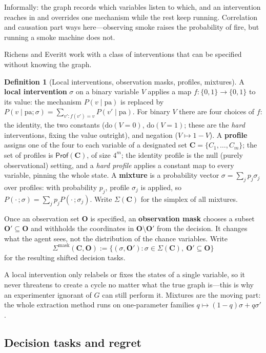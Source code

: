 \documentclass[11pt]{amsart}
\theoremstyle{plain}
\theoremstyle{definition}
\newtheorem{definition}[theorem]{Definition}
\newcommand{\bC}{\mathbf{C}}
\newcommand{\bO}{\mathbf{O}}
\newcommand{\Prof}{\mathsf{Prof}}
\begin{document}
Informally: the graph records which variables listen to which, and an intervention reaches in and overrides one mechanism while the rest keep running. Correlation and causation part ways here---observing smoke raises the probability of fire, but running a smoke machine does not.

Richens and Everitt work with a class of interventions that can be specified without knowing the graph.

\begin{definition}[Local interventions, observation masks, profiles, mixtures]\label{def:local}
A \textbf{local intervention} $\sigma$ on a binary variable $V$ applies a map $f\colon\{0,1\}\to\{0,1\}$ to its value: the mechanism $P(v\mid \mathrm{pa})$ is replaced by $P(v \mid \mathrm{pa};\sigma)=\sum_{v'\colon f(v')=v}P(v'\mid \mathrm{pa})$. For binary $V$ there are four choices of $f$: the identity, the two constants ($\mathrm{do}(V\!=\!0)$, $\mathrm{do}(V\!=\!1)$; these are the \emph{hard} interventions, fixing the value outright), and negation ($V\mapsto 1-V$). A \textbf{profile} assigns one of the four to each variable of a designated set $\bC=\{C_1,\dots,C_m\}$; the set of profiles is $\Prof(\bC)$, of size $4^{m}$; the identity profile is the null (purely observational) setting, and a \emph{hard profile} applies a constant map to every variable, pinning the whole state. A \textbf{mixture} is a probability vector $\sigma=\sum_j p_j\sigma_j$ over profiles: with probability $p_j$, profile $\sigma_j$ is applied, so $P(\cdot\,;\sigma)=\sum_j p_j P(\cdot\,;\sigma_j)$. Write $\Sigma(\bC)$ for the simplex of all mixtures.

Once an observation set $\bO$ is specified, an \textbf{observation mask} chooses a subset $\bO'\subseteq\bO$ and withholds the coordinates in $\bO\setminus\bO'$ from the decision. It changes what the agent sees, not the distribution of the chance variables. Write
\[
   \Sigma^\mathrm{mask}(\bC,\bO)
   :=\{(\sigma,\bO'):\sigma\in\Sigma(\bC),\ \bO'\subseteq\bO\}
\]
for the resulting shifted decision tasks.
\end{definition}

A local intervention only relabels or fixes the states of a single variable, so it never threatens to create a cycle no matter what the true graph is---this is why an experimenter ignorant of $G$ can still perform it. Mixtures are the moving part: the whole extraction method runs on one-parameter families $q\mapsto (1-q)\sigma+q\sigma'$.

\subsection{Decision tasks and regret}\label{subsec:decision}
\end{document}
